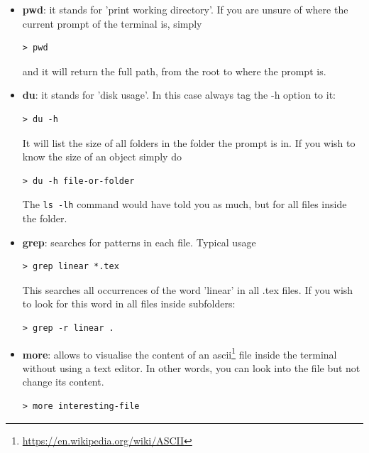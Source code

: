 \begin{itemize}
\item {\color{teal} \bf pwd}: it stands for 'print working directory'. If you are unsure of where
the current prompt of the terminal is, simply 
\begin{mdframed}[backgroundcolor=gray!10]
\begin{verbatim}
> pwd 
\end{verbatim}
\end{mdframed}
and it will return the full path, from the root to where the prompt is. 


\item {\color{teal} \bf du}: it stands for 'disk usage'. In this case always tag the -h option to it:
\begin{mdframed}[backgroundcolor=gray!10]
\begin{verbatim}
> du -h 
\end{verbatim}
\end{mdframed}
It will list the size of all folders in the folder the prompt is in. If you wish to know the size of an object
simply do 
\begin{mdframed}[backgroundcolor=gray!10]
\begin{verbatim}
> du -h file-or-folder 
\end{verbatim}
\end{mdframed}
The {\tt ls -lh} command would have told you as much, but for all files inside the folder.

\item {\color{teal} \bf grep}: searches for patterns in each file. Typical usage 
\begin{mdframed}[backgroundcolor=gray!10]
\begin{verbatim}
> grep linear *.tex 
\end{verbatim}
\end{mdframed}
This searches all occurrences of the word 'linear' in all .tex files. If you 
wish to look for this word in all files inside subfolders:
\begin{mdframed}[backgroundcolor=gray!10]
\begin{verbatim}
> grep -r linear .
\end{verbatim}
\end{mdframed}

\item {\color{teal} \bf more}: allows to visualise the content of an ascii\footnote{\url{https://en.wikipedia.org/wiki/ASCII}} file
inside the terminal without using a text editor. In other words, you can look into the file but not change its content.
\begin{mdframed}[backgroundcolor=gray!10]
\begin{verbatim}
> more interesting-file
\end{verbatim}
\end{mdframed}
 




\end{itemize}
